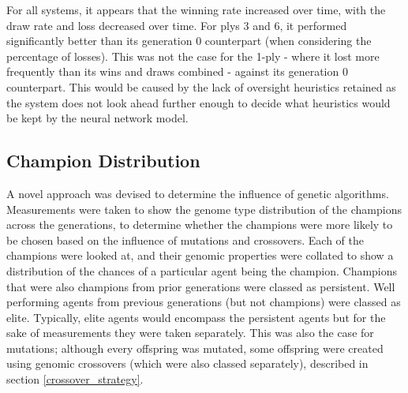 \documentclass[12pt,a4paper]{article}
\begin{document}
    For all systems, it appears that the winning rate increased over time, with the draw rate and loss decreased over time. For plys 3 and 6, it performed significantly better than its generation 0 counterpart (when considering the percentage of losses). This was not the case for the 1-ply - where it lost more frequently than its wins and draws combined - against its generation 0 counterpart. This would be caused by the lack of oversight heuristics retained as the system does not look ahead further enough to decide what heuristics would be kept by the neural network model.

    \subsection{Champion Distribution}
        A novel approach was devised to determine the influence of genetic algorithms. Measurements were taken to show the genome type distribution of the champions across the generations, to determine whether the champions were more likely to be chosen based on the influence of mutations and crossovers. Each of the champions were looked at, and their genomic properties were collated to show a distribution of the chances of a particular agent being the champion. Champions that were also champions from prior generations were classed as persistent. Well performing agents from previous generations (but not champions) were classed as elite. Typically, elite agents would encompass the persistent agents but for the sake of measurements they were taken separately. This was also the case for mutations; although every offspring was mutated, some offspring were created using genomic crossovers (which were also classed separately), described in section \ref{crossover_strategy}.  
\end{document}

